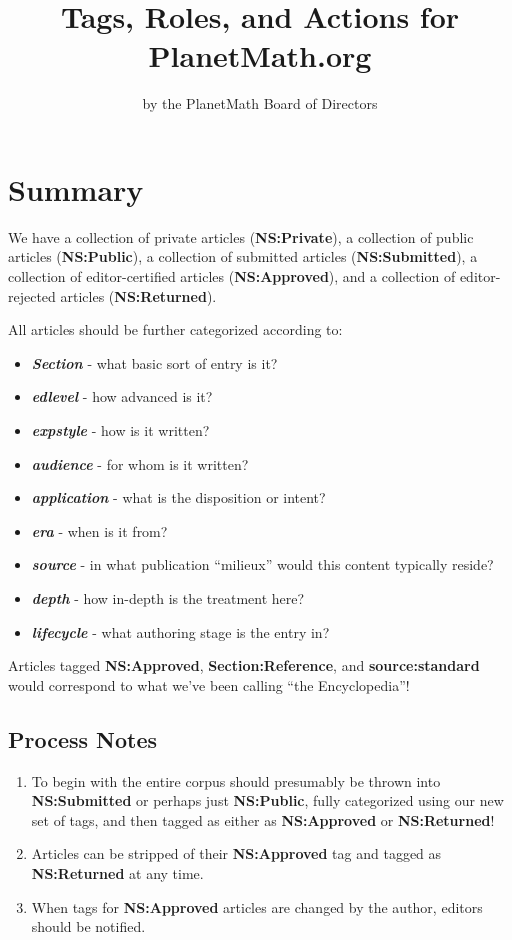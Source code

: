 \documentclass[12pt]{article}
\begin{document}
\title{Tags, Roles, and Actions for PlanetMath.org}
\author{by the PlanetMath Board of Directors}

\maketitle

\section{Summary}

We have a collection of private articles ({\bf NS:Private}), a
collection of public articles ({\bf NS:Public}), a collection of
submitted articles ({\bf NS:Submitted}), a collection of
editor-certified articles ({\bf NS:Approved}), and a collection
of editor-rejected articles ({\bf NS:Returned}).

All articles should be further categorized according to:

\begin{itemize}
\item {\bf \emph{Section}} - what basic sort of entry is it?
\item {\bf \emph{edlevel}} - how advanced is it?
\item {\bf \emph{expstyle}} - how is it written?
\item {\bf \emph{audience}} - for whom is it written?
\item {\bf \emph{application}} - what is the disposition or intent?
\item {\bf \emph{era}} - when is it from?
\item {\bf \emph{source}} - in what publication ``milieux'' would this content typically reside?
\item {\bf \emph{depth}} - how in-depth is the treatment here?
\item {\bf \emph{lifecycle}} - what authoring stage is the entry in?
\end{itemize}

Articles tagged {\bf NS:Approved}, {\bf
 Section:Reference}, and {\bf source:standard} would
correspond to what we've been calling ``the Encyclopedia''!

\subsection*{Process Notes}

\begin{enumerate}
\item To begin with the entire corpus should presumably be
 thrown into {\bf NS:Submitted} or perhaps just {\bf
 NS:Public}, fully categorized using our new set of
 tags, and then tagged as either as {\bf NS:Approved} or
 {\bf NS:Returned}!

\item Articles can be stripped of their {\bf NS:Approved}
 tag and tagged as {\bf NS:Returned} at any time.

\item When tags for {\bf NS:Approved} articles are changed
 by the author, editors should be notified.
\end{enumerate}
\end{document}
